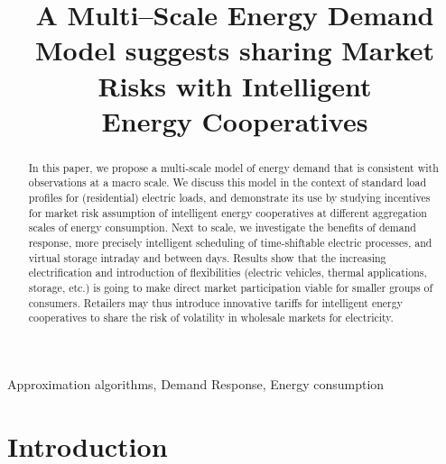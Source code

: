 \documentclass[conference]{IEEEtran}
\begin{document}
\title{A Multi--Scale Energy Demand Model suggests sharing Market Risks with Intelligent\\ Energy Cooperatives}
\author{
}

\maketitle

\begin{abstract} In this paper, we propose a multi-scale model of energy demand that is consistent with observations at a macro scale. We discuss this model in the context of standard load profiles for (residential) electric loads, and demonstrate its use by studying incentives for market risk assumption of intelligent energy cooperatives at different aggregation scales of energy consumption. Next to scale, we investigate the benefits of demand response, more precisely intelligent scheduling of time-shiftable electric processes, and virtual storage intraday and between days. Results show that the increasing electrification and introduction of flexibilities (electric vehicles, thermal applications, storage, etc.) is going to make direct market participation viable for smaller groups of consumers. Retailers may thus introduce innovative tariffs for intelligent energy cooperatives to share the risk of volatility in wholesale markets for electricity.
\end{abstract}

\begin{keywords}
Approximation algorithms, Demand Response, Energy consumption
\end{keywords}

\IEEEpeerreviewmaketitle

\section{Introduction}
\label{sec:Introduction}
\end{document}
